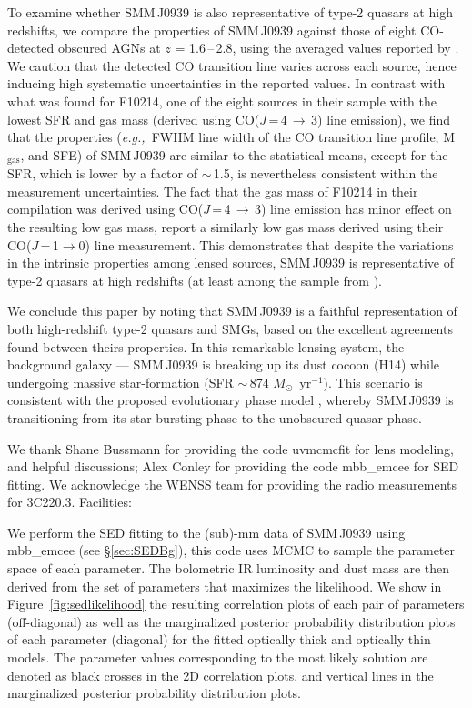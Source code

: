 \documentclass[twocolumn,apj,numberedappendix]{emulateapj}
\newcommand{\Msun}{\mbox{$M_{\odot}$}}
\newcommand{\rarr}{$\rightarrow$}
\newcommand{\eg}{{\sl e.g.,~}}
\newcommand{\pmOne}{\mbox{$^{-1}$}}
\begin{document}
To examine whether SMM\,J0939 is also representative of type-2 quasars at high redshifts, we compare the properties of SMM\,J0939 
against those of eight CO-detected obscured AGNs at $z$ = 1.6\,--\,2.8, using the averaged values reported by \citet[][and references 
therein]{Polletta11a}. We caution that the detected CO 
transition line varies across each source, 
hence inducing high systematic uncertainties in the reported values. 
In contrast with what was found for F10214, one of the eight sources in their sample with the lowest SFR and gas mass (derived using CO($J$\,=\,4\,\rarr\,3) line emission), we find that the properties 
(\eg FWHM line width of the CO transition line profile, M$_\textrm{gas}$, and SFE) of SMM\,J0939 are similar to the statistical means, except for the SFR, which is lower by a 
factor of $\sim$\,1.5, is nevertheless consistent within the measurement uncertainties. The fact that the gas mass of F10214 in their compilation was derived using CO($J$\,=\,4\,\rarr\,3) line emission has minor effect on the resulting low gas mass, \citet{Riechers11a} report a similarly low gas mass derived using their CO($J$\,=\,1\rarr0) line measurement. This demonstrates that despite the variations in the intrinsic properties among lensed sources,
 SMM\,J0939 is representative of type-2 quasars at high redshifts (at least among the sample from \citet{Polletta11a}). 

We conclude this paper by noting that SMM\,J0939 is a faithful representation of both high-redshift type-2 quasars and SMGs, 
based on the excellent agreements found between theirs properties. In this remarkable lensing system, the background galaxy --- SMM\,J0939 is 
breaking up its dust cocoon (H14) while undergoing massive star-formation (SFR $\sim$\,874 \Msun~yr\pmOne). 
This scenario is consistent with the proposed evolutionary phase model \citep{Coppin08a,Simpson12a}, whereby SMM\,J0939 is transitioning from its star-bursting phase to the unobscured quasar phase. 

\acknowledgments
We thank Shane Bussmann for providing the code {\sc uvmcmcfit} for lens modeling, and helpful discussions; Alex Conley for providing the code {\sc mbb\_emcee} for SED fitting. We acknowledge the WENSS team for providing the radio measurements for 3C220.3. 
Facilities: 
\newpage



\appendix
We perform the SED fitting to the (sub)-mm data of SMM\,J0939 using {\sc mbb\_emcee} (see \S \ref{sec:SEDBg}), this code uses MCMC to sample the parameter space of each parameter. The bolometric IR luminosity and dust mass are then derived from the set of parameters that maximizes the likelihood. 
We show in Figure~\ref{fig:sedlikelihood} the resulting correlation plots of each pair of parameters (off-diagonal) as well as the marginalized posterior probability distribution plots of each parameter (diagonal) for the fitted optically thick and optically thin models.
The parameter values corresponding to the most likely solution are denoted as black crosses in the 2D correlation plots, and vertical lines in the marginalized posterior probability distribution plots. \par
\end{document}
